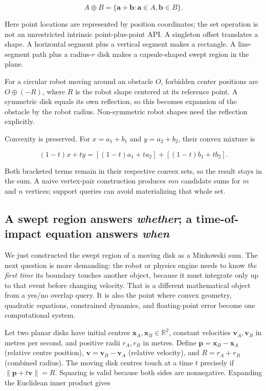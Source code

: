 \[
A\oplus B=\{\mathbf a+\mathbf b:\mathbf a\in A,\mathbf b\in B\}.
\]

Here point locations are represented by position coordinates; the set operation is not an unrestricted intrinsic point-plus-point API. A singleton offset translates a shape. A horizontal segment plus a vertical segment makes a rectangle. A line-segment path plus a radius-\(r\) disk makes a capsule-shaped swept region in the plane.

For a circular robot moving around an obstacle \(O\), forbidden center positions are \(O\oplus(-R)\), where \(R\) is the robot shape centered at its reference point. A symmetric disk equals its own reflection, so this becomes expansion of the obstacle by the robot radius. Non-symmetric robot shapes need the reflection explicitly.

Convexity is preserved. For \(x=a_1+b_1\) and \(y=a_2+b_2\), their convex mixture is

\[
(1-t)x+ty=[(1-t)a_1+ta_2]+[(1-t)b_1+tb_2].
\]

Both bracketed terms remain in their respective convex sets, so the result stays in the sum. A naive vertex-pair construction produces \(mn\) candidate sums for \(m\) and \(n\) vertices; support queries can avoid materializing that whole set.

\subsection{\texorpdfstring{A swept region answers \emph{whether}; a time-of-impact equation answers \emph{when}}{A swept region answers whether; a time-of-impact equation answers when}}\label{01-foundations-i-ch018-a-swept-region-answers-whether-a-time-of-impact-equation-answers-when}

\hypertarget{01-foundations-i-ch018-a-swept-region-answers-whether-a-time-of-impact-equation-answers-when}{}

We just constructed the swept region of a moving disk as a Minkowski sum. The next question is more demanding: the robot or physics engine needs to know \emph{the first time} its boundary touches another object, because it must integrate only up to that event before changing velocity. That is a different mathematical object from a yes/no overlap query. It is also the point where convex geometry, quadratic equations, constrained dynamics, and floating-point error become one computational system.

Let two planar disks have initial centres \(\mathbf x_A,\mathbf x_B\in\mathbb R^2\), constant velocities \(\mathbf v_A,\mathbf v_B\) in metres per second, and positive radii \(r_A,r_B\) in metres. Define \(\mathbf p=\mathbf x_B-\mathbf x_A\) (relative centre position), \(\mathbf v=\mathbf v_B-\mathbf v_A\) (relative velocity), and \(R=r_A+r_B\) (combined radius). The moving disk centres touch at a time \(t\) precisely if \(\|\mathbf p+t\mathbf v\|=R\). Squaring is valid because both sides are nonnegative. Expanding the Euclidean inner product gives

